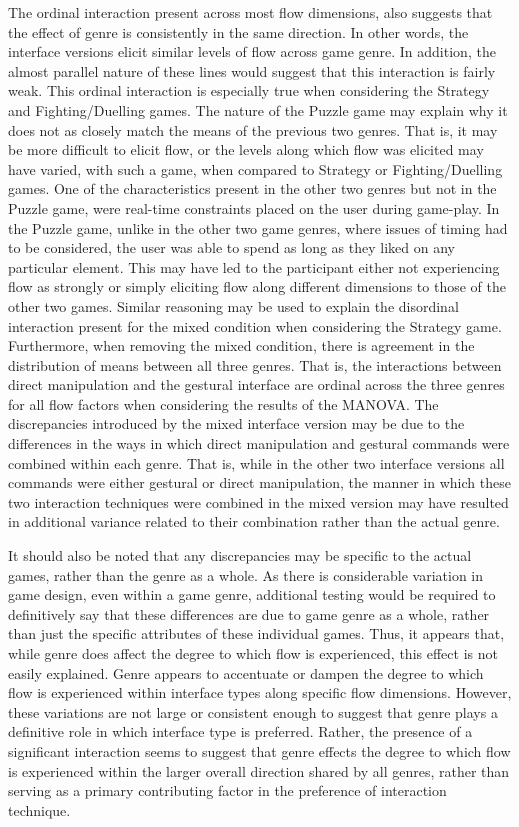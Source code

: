 The ordinal interaction present across most flow dimensions, also suggests that the effect of genre is consistently in the same direction. In other words, the interface versions elicit similar levels of flow across game genre. In addition, the almost parallel nature of these lines would suggest that this interaction is fairly weak. This ordinal interaction is especially true when considering the Strategy and Fighting/Duelling games. The nature of the Puzzle game may explain why it does not as closely match the means of the previous two genres. That is, it may be more difficult to elicit flow, or the levels along which flow was elicited may have varied, with such a game, when compared to Strategy or Fighting/Duelling games. One of the characteristics present in the other two genres but not in the Puzzle game, were real-time constraints placed on the user during game-play. In the Puzzle game, unlike in the other two game genres, where issues of timing had to be considered, the user was able to spend as long as they liked on any particular element. This may have led to the participant either not experiencing flow as strongly or simply eliciting flow along different dimensions to those of the other two games. Similar reasoning may be used to explain the disordinal interaction present for the mixed condition when considering the Strategy game. Furthermore, when removing the mixed condition, there is agreement in the distribution of means between all three genres. That is, the interactions between direct manipulation and the gestural interface are ordinal across the three genres for all flow factors when considering the results of the MANOVA. The discrepancies introduced by the mixed interface version may be due to the differences in the ways in which direct manipulation and gestural commands were combined within each genre. That is, while in the other two interface versions all commands were either gestural or direct manipulation, the manner in which these two interaction techniques were combined in the mixed version may have resulted in additional variance related to their combination rather than the actual genre.

It should also be noted that any discrepancies may be specific to the actual games, rather than the genre as a whole. As there is considerable variation in game design, even within a game genre, additional testing would be required to definitively say that these differences are due to game genre as a whole, rather than just the specific attributes of these individual games. Thus, it appears that, while genre does affect the degree to which flow is experienced, this effect is not easily explained. Genre appears to accentuate or dampen the degree to which flow is experienced within interface types along specific flow dimensions. However, these variations are not large or consistent enough to suggest that genre plays a definitive role in which interface type is preferred. Rather, the presence of a significant interaction seems to suggest that genre effects the degree to which flow is experienced within the larger overall direction shared by all genres, rather than serving as a primary contributing factor in the preference of interaction technique.

